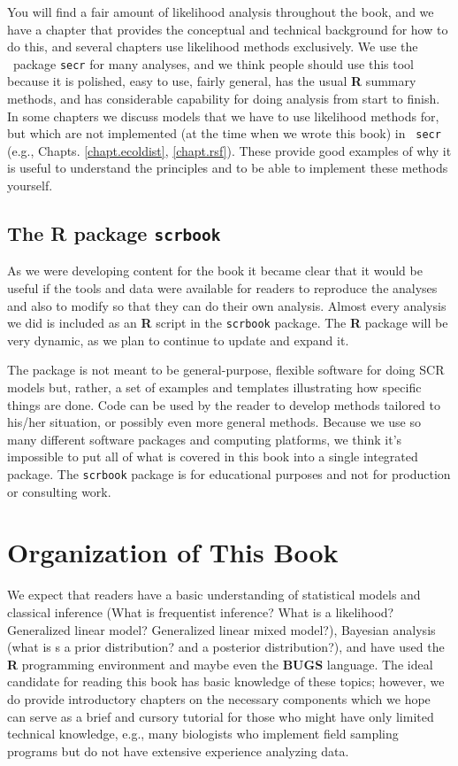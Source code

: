 You will find a fair amount of likelihood analysis throughout the book,
 and we have a chapter that
provides the conceptual and technical background for how to do this,
and several chapters use likelihood methods exclusively. We use the
\R~package \mbox{\tt secr} \citep{efford_etal:2009euring} for many
analyses, and we think people should use this tool because it is polished,
easy to use, fairly general, has the usual {\bf R} summary methods,
and has considerable capability for doing analysis from start to
finish. In some chapters we discuss models that we have to use
likelihood methods for, but which are not implemented (at the time
when we wrote this book) in \mbox{\tt
  secr} (e.g., Chapts. \ref{chapt.ecoldist}, \ref{chapt.rsf}). These
provide 
good examples of why it is useful to understand the principles and to
be able to implement these methods yourself.

\subsection*{The R package {\tt scrbook}}

As we were developing content for the book it became clear that it
would be useful if the tools and data were available for
readers to reproduce the analyses and also to modify so that they can
do their own analysis.  Almost every analysis we did is included as an
{\bf R} script in the \mbox{\tt scrbook} package.
The {\bf R} package will be very dynamic, as we plan to
continue to update and expand it.

The 
package is not meant to be general-purpose, 
flexible software for doing SCR models but, rather, a set of examples
and templates 
illustrating how specific things are done. Code can be used
by the reader to develop methods tailored to his/her situation, or
possibly even more general methods.  Because we use so many different
software packages and computing platforms, we think it's impossible to
put all of what is covered in this book into a single integrated
package.  The \mbox{\tt scrbook} package is for educational purposes
and not for production or consulting work.


\section*{Organization of This Book}

We expect that readers have a basic understanding of statistical
models and classical inference (What is frequentist inference? What is
a likelihood? Generalized linear model? Generalized linear mixed
model?), Bayesian analysis (what is s a prior distribution? and a
posterior distribution?), and have used the {\bf R} programming
environment and maybe even 
the \textbf{BUGS} language.  The ideal candidate for
reading this book has basic knowledge of these topics; however, we do
provide introductory chapters on the necessary components which we
hope can serve as a brief and cursory tutorial for those who might
have only limited technical knowledge, e.g., many biologists who
implement field sampling programs but do not have extensive experience
analyzing data.

